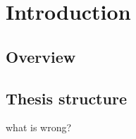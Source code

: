 \setcounter{chapter}{-1}
\chapter{Introduction}
%
\section{Overview}
%
%
%
\section{Thesis structure}
what is wrong?~\cite{Daemen99aesproposal:}
